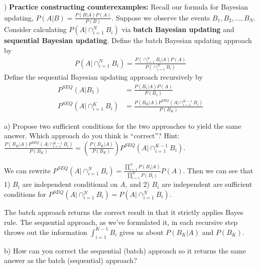 \documentclass[12pt,english]{article}
\begin{document}
\vspace{1em}
) \textbf{Practice constructing counterexamples:} Recall our formula for Bayesian updating, $P(A | B) = \frac{P(B | A) P(A)}{P(B)}$. Suppose we observe the events $B_{1}, B_{2}, \ldots, B_{N}$. Consider calculating $P(A | \cap_{i = 1}^{N} B_{i})$ via \textbf{batch Bayesian updating} and \textbf{sequential Bayesian updating}. Define the batch Bayesian updating approach by
\begin{align*}
P(A | \cap_{i = 1}^{N} B_{i}) = \frac{P(\cap_{i = 1}^{N} B_{i} | A) P(A)}{P(\cap_{i = 1}^{N} B_{i})}
\end{align*}
Define the sequential Bayesian updating approach recursively by
\begin{align*}
P^{SEQ}(A | B_{1}) & = \frac{P(B_{1} | A) P(A)}{P(B_{1})} \\
P^{SEQ}(A | \cap_{i = 1}^{K} B_{i}) & = \frac{P(B_{K} | A) P^{SEQ}(A | \cap_{i = 1}^{K - 1} B_{i})}{P(B_{K})}
\end{align*}

a) Propose two sufficient conditions for the two approaches to yield the same answer. Which approach do you think is ``correct''? Hint: $\frac{P(B_{K} | A) P^{SEQ}(A | \cap_{i = 1}^{K - 1} B_{i})}{P(B_{K})} = \left( \frac{P(B_{K} | A)}{P(B_{K})} \right) P^{SEQ}(A | \cap_{i = 1}^{K - 1} B_{i})$.

\vspace{1em}

We can rewrite $P^{SEQ}(A | \cap_{i=1}^{N} B_{i}) = \frac{\prod_{i = 1}^{N} P(B_{i} | A)}{\prod_{i = 1}^{N} P(B_{i})} P(A)$. Then we can see that 1) $B_{i}$ are independent conditional on $A$, and 2) $B_{i}$ are independent are sufficient conditions for $P^{SEQ}(A | \cap_{i=1}^{N} B_{i}) = P(A | \cap_{i=1}^{N} B_{i})$.

The batch approach returns the correct result in that it strictly applies Bayes rule. The sequential approach, as we've formulated it, in each recursive step throws out the information $\int_{i=1}^{K-1} B_{i}$ gives us about $P(B_{K} | A)$ and $P(B_{K})$.

\vspace{1em}

b) How can you correct the sequential (batch) approach so it returns the same answer as the batch (sequential) approach?

\vspace{1em}
\end{document}
